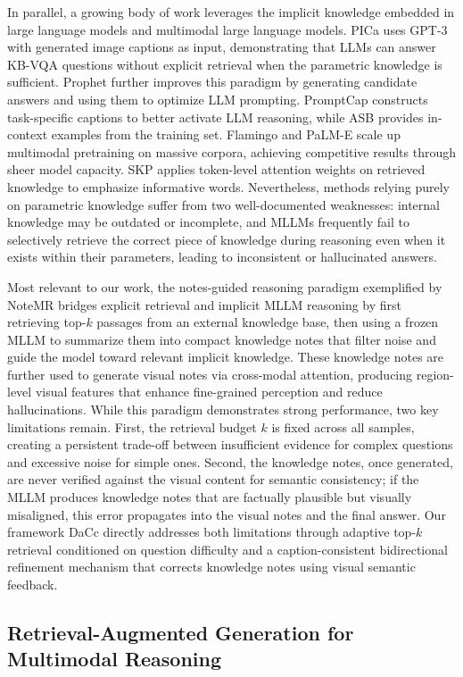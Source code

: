 \documentclass[manuscript,screen,review]{acmart}
\begin{document}
In parallel, a growing body of work leverages the implicit knowledge embedded in large language models and multimodal large language models. PICa uses GPT-3 with generated image captions as input, demonstrating that LLMs can answer KB-VQA questions without explicit retrieval when the parametric knowledge is sufficient. Prophet further improves this paradigm by generating candidate answers and using them to optimize LLM prompting. PromptCap constructs task-specific captions to better activate LLM reasoning, while ASB provides in-context examples from the training set. Flamingo and PaLM-E scale up multimodal pretraining on massive corpora, achieving competitive results through sheer model capacity. SKP applies token-level attention weights on retrieved knowledge to emphasize informative words. Nevertheless, methods relying purely on parametric knowledge suffer from two well-documented weaknesses: internal knowledge may be outdated or incomplete, and MLLMs frequently fail to selectively retrieve the correct piece of knowledge during reasoning even when it exists within their parameters, leading to inconsistent or hallucinated answers.

Most relevant to our work, the notes-guided reasoning paradigm exemplified by NoteMR bridges explicit retrieval and implicit MLLM reasoning by first retrieving top-$k$ passages from an external knowledge base, then using a frozen MLLM to summarize them into compact knowledge notes that filter noise and guide the model toward relevant implicit knowledge. These knowledge notes are further used to generate visual notes via cross-modal attention, producing region-level visual features that enhance fine-grained perception and reduce hallucinations. While this paradigm demonstrates strong performance, two key limitations remain. First, the retrieval budget $k$ is fixed across all samples, creating a persistent trade-off between insufficient evidence for complex questions and excessive noise for simple ones. Second, the knowledge notes, once generated, are never verified against the visual content for semantic consistency; if the MLLM produces knowledge notes that are factually plausible but visually misaligned, this error propagates into the visual notes and the final answer. Our framework DaCc directly addresses both limitations through adaptive top-$k$ retrieval conditioned on question difficulty and a caption-consistent bidirectional refinement mechanism that corrects knowledge notes using visual semantic feedback.

\subsection{Retrieval-Augmented Generation for Multimodal Reasoning}
\end{document}
